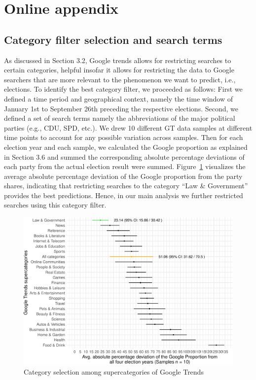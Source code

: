 \documentclass[
  letterpaper,
  DIV=11,
  numbers=noendperiod]{scrartcl}
\newcommand{\beginsupplement}{\setcounter{table}{0}  \renewcommand{\thetable}{A\arabic{table}} \setcounter{figure}{0} \renewcommand{\thefigure}{A\arabic{figure}}}
\begin{document}
\newpage

\hypertarget{online-appendix}{%
\section{Online appendix}\label{online-appendix}}

\beginsupplement

\hypertarget{category-filter-selection-and-search-terms}{%
\subsection{Category filter selection and search
terms}\label{category-filter-selection-and-search-terms}}

As discussed in Section 3.2, Google trends allows for restricting
searches to certain categories, helpful insofar it allows for
restricting the data to Google searchers that are more relevant to the
phenomenon we want to predict, i.e., elections. To identify the best
category filter, we proceeded as follows: First we defined a time period
and geographical context, namely the time window of January 1st to
September 26th preceding the respective elections. Second, we defined a
set of search terms namely the abbreviations of the major political
parties (e.g., CDU, SPD, etc.). We drew 10 different GT data samples at
different time points to account for any possible variation across
samples. Then for each election year and each sample, we calculated the
Google proportion as explained in Section 3.6 and summed the
corresponding absolute percentage deviations of each party from the
actual election result were summed. Figure~\ref{fig-A1} visualizes the
average absolute percentage deviation of the Google proportion from the
party shares, indicating that restricting searches to the category ``Law
\& Government'' provides the best predictions. Hence, in our main
analysis we further restricted searches using this category filter.

\begin{figure}[H]

\caption{\label{fig-A1}Category selection among supercategories of
Google Trends}

{\centering \includegraphics{figures/fig-A1-1.pdf}

}

\end{figure}
\end{document}
